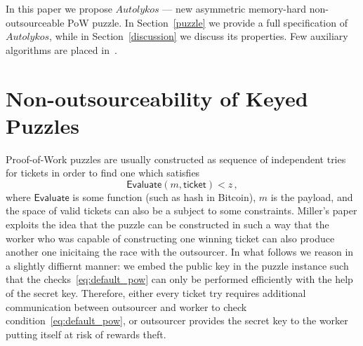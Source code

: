 \documentclass[]{article}
\newcommand{\Eval}{\mathsf{Evaluate}}
\newcommand{\Name}{$Autolykos$}
\begin{document}
    In this paper we propose \Name{} --- new asymmetric memory-hard non-outsourceable PoW puzzle.
    In Section~\ref{puzzle} we provide a full
    specification of \Name, while in Section~\ref{discussion} we discuss its
    properties. Few auxiliary algorithms are placed in~.

    \section{Non-outsourceability of Keyed Puzzles}
    Proof-of-Work puzzles are usually constructed as sequence of independent
    tries for tickets in order to find one which satisfies
    \begin{equation}
        \Eval(m,\mathsf{ticket})<z\,,
        \label{eq:default_pow}
    \end{equation}
    where $\Eval$ is some function (such as hash in Bitcoin), $m$ is the payload,
    and the space of valid tickets can also be a subject to some constraints.
    Miller's paper exploits the idea that the puzzle can be constructed in such
    a way that the worker who was capable of constructing one winning ticket can
    also produce another one inicitaing the race with the outsourcer. In what
    follows we reason in a slightly diffiernt manner: we embed the public key in
    the puzzle instance such that the checks~\eqref{eq:default_pow} can only be
    performed efficiently with the help of the secret key. Therefore,
    either every ticket try requires additional communication between outsourcer
    and worker to check condition~\eqref{eq:default_pow}, or outsourcer provides
    the secret key to the worker putting itself at risk of rewards theft.
\end{document}

